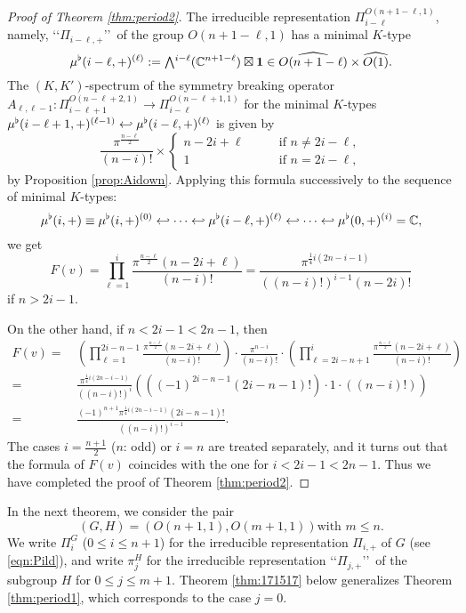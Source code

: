 \begin{proof}
[Proof of Theorem \ref{thm:period2}]
The irreducible representation $\Pi_{i-\ell}^{O(n+1-\ell,1)}$, 
 namely, 
\lq\lq{$\Pi_{i-\ell,+}$}\rq\rq\
 of the group $O(n+1-\ell, 1)$
 has a minimal $K$-type
\[
   \mub(i-\ell,+)^{(\ell)}
   :=
   \Exterior^{i-\ell}({\mathbb{C}}^{n+1-\ell}) \boxtimes {\bf{1}}
   \in \widehat{O(n+1-\ell)}\times \widehat{O(1)}. 
\]
The $(K,K')$-spectrum of the symmetry breaking operator
 $A_{\ell, \ell-1}
   \colon
   \Pi_{i-\ell+1}^{O(n-\ell+2,1)} \to \Pi_{i-\ell}^{O(n-\ell+1,1)}
$
 for the minimal $K$-types
 $\mu^{\flat} (i-\ell+1,+)^{(\ell-1)} \hookleftarrow \mu^{\flat} (i-\ell,+)^{(\ell)}$
 is given by 
\[
\frac{\pi^{\frac {n-\ell}{2}}}{(n-i)!} \times 
\begin{cases}  
 n-2i+ \ell \qquad &\text{if $n \ne 2i -\ell$}, 
\\
  1 
  &\text{if $n = 2i -\ell$}, 
\end{cases}
\]
by Proposition \ref{prop:Aidown}.  
Applying this formula successively 
 to the sequence of minimal $K$-types:
\[
  \mu^{\flat}(i,+) \equiv \mu^{\flat}(i,+)^{(0)} \hookleftarrow \cdots \hookleftarrow
  \mu^{\flat}(i-\ell,+)^{(\ell)} \hookleftarrow \cdots 
  \hookleftarrow \mu^{\flat}(0,+)^{(i)}={\mathbb{C}}, 
\]
we get
\[
  F(v)=\prod_{\ell=1}^i \frac{\pi^{\frac{n-\ell}{2}} (n-2i+\ell)}{(n-i)!}
  =\frac{\pi^{\frac{1}{4}i(2n-i-1)}}{((n-i)!)^{i-1}(n-2i)!}
\]
 if $n > 2i-1$.  



On the other hand, 
 if $n < 2i-1< 2n-1$, 
 then 
\begin{align*}
  F(v)
  =\,&
  \left(\prod_{\ell=1}^{2i-n-1} \frac{\pi^{\frac{n-\ell}{2}} (n-2i+\ell)}{(n-i)!}\right)
  \cdot
  \frac{\pi^{n-i}}{(n-i)!}
  \cdot
 \left(\prod_{\ell=2i-n+1}^{i}\frac{\pi^{\frac{n-\ell}{2}} (n-2i+\ell)}{(n-i)!}\right)
\\
=\,&
\frac{\pi^{\frac 1 4 i(2n-i-1)}}{((n-i)!)^i}
(((-1)^{2i-n-1}(2i-n-1)!)\cdot 1 \cdot ((n-i)!))
\\
=\,&
\frac{(-1)^{n+1} \pi^{\frac 1 4 i(2n-i-1)}(2i-n-1)!}{((n-i)!)^{i-1}}.  
\end{align*}
The cases $i= \frac{n+1}{2}$ ($n$: odd) or $i=n$ are treated separately, 
 and it turns out that the formula of $F(v)$ coincides
 with the one for $i < 2i-1< 2n-1$.  
Thus we have completed the proof of Theorem \ref{thm:period2}.  
\end{proof}

In the next theorem,
 we consider the pair
\[
 \text{$(G,H)=(O(n+1,1),O(m+1,1))$
 with $m \le n$}.  
\]
We write $\Pi_i^G$ ($0 \le i \le n+1$)
 for the irreducible representation $\Pi_{i,+}$
 of $G$
 (see \eqref{eqn:Pild}),
 and write $\pi_j^H$ for the irreducible representation 
 \lq\lq{$\Pi_{j,+}$}\rq\rq\
 of the subgroup $H$ 
 for $0 \le j \le m+1$.  
Theorem \ref{thm:171517} below generalizes Theorem \ref{thm:period1}, 
 which corresponds to the case $j=0$.  

